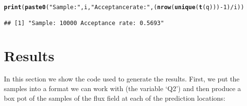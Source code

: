 \documentclass[a4paper,11pt]{article}\usepackage[]{graphicx}\usepackage[]{color}
\makeatletter
\newcommand{\hlnum}[1]{\textcolor[rgb]{0.686,0.059,0.569}{#1}}%
\newcommand{\hlstr}[1]{\textcolor[rgb]{0.192,0.494,0.8}{#1}}%
\newcommand{\hlopt}[1]{\textcolor[rgb]{0,0,0}{#1}}%
\newcommand{\hlstd}[1]{\textcolor[rgb]{0.345,0.345,0.345}{#1}}%
\newcommand{\hlkwd}[1]{\textcolor[rgb]{0.737,0.353,0.396}{\textbf{#1}}}%
\newenvironment{kframe}{%
 \def\at@end@of@kframe{}%
 \ifinner\ifhmode%
  \def\at@end@of@kframe{\end{minipage}}%
  \begin{minipage}{\columnwidth}%
 \fi\fi%
 \def\FrameCommand##1{\hskip\@totalleftmargin \hskip-\fboxsep
 \colorbox{shadecolor}{##1}\hskip-\fboxsep
     \hskip-\linewidth \hskip-\@totalleftmargin \hskip\columnwidth}%
 \MakeFramed {\advance\hsize-\width
   \@totalleftmargin\z@ \linewidth\hsize
   \@setminipage}}%
 {\par\unskip\endMakeFramed%
 \at@end@of@kframe}
\newenvironment{knitrout}{}{} %
\makeatother
\begin{document}
\begin{knitrout}
\color{fgcolor}\begin{kframe}
\begin{alltt}
\hlkwd{print}\hlstd{(}\hlkwd{paste0}\hlstd{(}\hlstr{"Sample: "}\hlstd{,i,}\hlstr{" Acceptance rate: "}\hlstd{,(}\hlkwd{nrow}\hlstd{(}\hlkwd{unique}\hlstd{(}\hlkwd{t}\hlstd{(q)))}\hlopt{-}\hlnum{1}\hlstd{)}\hlopt{/}\hlstd{i))}
\end{alltt}
\begin{verbatim}
## [1] "Sample: 10000 Acceptance rate: 0.5693"
\end{verbatim}
\end{kframe}
\end{knitrout}

\section{Results}

In this section we show the code used to generate the results. First, we put the samples into a format we can work with (the variable `Q2') and then produce a box pot of the samples of the flux field at each of the prediction locations:
\end{document}

